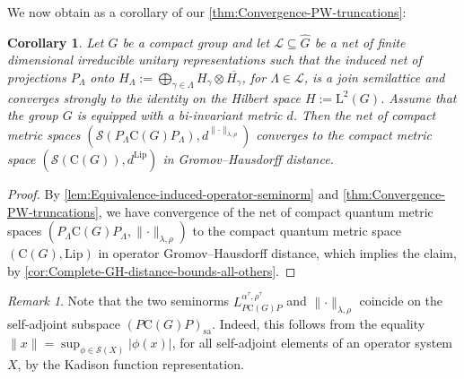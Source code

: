 \documentclass{amsart}
\theoremstyle{plain}
\newtheorem{corollary}[theorem]{Corollary}
\theoremstyle{definition}
\theoremstyle{remark}
\newtheorem{remark}[theorem]{Remark}
\begin{document}
	We now obtain \cite[Theorem 16]{GEvS23} as a corollary of our \autoref{thm:Convergence-PW-truncations}:
	
	\begin{corollary}
		Let $G$ be a compact group and let $\mathcal{L} \subseteq \widehat{G}$ be a net of finite dimensional irreducible unitary representations such that the induced net of projections $P_\Lambda$ onto $H_\Lambda := \bigoplus_{\gamma \in \Lambda} H_\gamma \otimes \overline{H_\gamma}$, for $\Lambda \in \mathcal{L}$, is a join semilattice and converges strongly to the identity on the Hilbert space $H := \mathrm{L}^2(G)$.
		Assume that the group $G$ is equipped with a bi-invariant metric $d$.
		Then the net of compact metric spaces $(\mathcal{S}(P_\Lambda \mathrm{C}(G) P_\Lambda),d^{\lVert\cdot\rVert_{\lambda,\rho}})$ converges to the compact metric space $(\mathcal{S}(\mathrm{C}(G)),d^{\mathrm{Lip}})$ in Gromov--Hausdorff distance.
	\end{corollary}
	
	\begin{proof}
		By \autoref{lem:Equivalence-induced-operator-seminorm} and \autoref{thm:Convergence-PW-truncations}, we have convergence of the net of compact quantum metric spaces $(P_\Lambda \mathrm{C}(G) P_\Lambda,\lVert\cdot\rVert_{\lambda,\rho})$ to the compact quantum metric space $(\mathrm{C}(G),\mathrm{Lip})$ in operator Gromov--Hausdorff distance,	which implies the claim, by \autoref{cor:Complete-GH-distance-bounds-all-others}.
	\end{proof}
	
	\begin{remark}
		Note that the two seminorms $L_{P\mathrm{C}(G)P}^{\alpha^\tau,\rho^\tau}$ and $\lVert\cdot\rVert_{\lambda,\rho}$ coincide on the self-adjoint subspace $(P\mathrm{C}(G)P)_\mathrm{sa}$.
		Indeed, this follows from the equality $\lVert x\rVert = \sup_{\phi \in \mathcal{S}(X)}|\phi(x)|$, for all self-adjoint elements of an operator system $X$, by the Kadison function representation.
	\end{remark}
\end{document}
